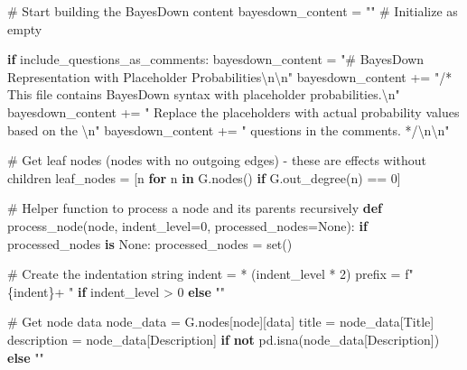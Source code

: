 \documentclass[
  11pt,
  letterpaper,
]{book}
\newenvironment{Shaded}{\begin{snugshade}}{\end{snugshade}}
\newcommand{\BuiltInTok}[1]{\textcolor[rgb]{0.00,0.23,0.31}{#1}}
\newcommand{\CharTok}[1]{\textcolor[rgb]{0.13,0.47,0.30}{#1}}
\newcommand{\CommentTok}[1]{\textcolor[rgb]{0.37,0.37,0.37}{#1}}
\newcommand{\ControlFlowTok}[1]{\textcolor[rgb]{0.00,0.23,0.31}{\textbf{#1}}}
\newcommand{\DecValTok}[1]{\textcolor[rgb]{0.68,0.00,0.00}{#1}}
\newcommand{\KeywordTok}[1]{\textcolor[rgb]{0.00,0.23,0.31}{\textbf{#1}}}
\newcommand{\NormalTok}[1]{\textcolor[rgb]{0.00,0.23,0.31}{#1}}
\newcommand{\OperatorTok}[1]{\textcolor[rgb]{0.37,0.37,0.37}{#1}}
\newcommand{\SpecialCharTok}[1]{\textcolor[rgb]{0.37,0.37,0.37}{#1}}
\newcommand{\SpecialStringTok}[1]{\textcolor[rgb]{0.13,0.47,0.30}{#1}}
\newcommand{\StringTok}[1]{\textcolor[rgb]{0.13,0.47,0.30}{#1}}
\newcommand{\VariableTok}[1]{\textcolor[rgb]{0.07,0.07,0.07}{#1}}
\begin{document}
\begin{Shaded}
\begin{Highlighting}[]
  \CommentTok{\# Start building the BayesDown content}
\NormalTok{  bayesdown\_content }\OperatorTok{=} \StringTok{""}  \CommentTok{\# Initialize as empty}

  \ControlFlowTok{if}\NormalTok{ include\_questions\_as\_comments:}
\NormalTok{    bayesdown\_content }\OperatorTok{=} \StringTok{"\# BayesDown Representation with Placeholder Probabilities}\CharTok{\textbackslash{}n\textbackslash{}n}\StringTok{"}
\NormalTok{    bayesdown\_content }\OperatorTok{+=} \StringTok{"/* This file contains BayesDown syntax with placeholder probabilities.}\CharTok{\textbackslash{}n}\StringTok{"}
\NormalTok{    bayesdown\_content }\OperatorTok{+=} \StringTok{"   Replace the placeholders with actual probability values based on the }\CharTok{\textbackslash{}n}\StringTok{"}
\NormalTok{    bayesdown\_content }\OperatorTok{+=} \StringTok{"   questions in the comments. */}\CharTok{\textbackslash{}n\textbackslash{}n}\StringTok{"}

  \CommentTok{\# Get leaf nodes (nodes with no outgoing edges) {-} these are effects without children}
\NormalTok{  leaf\_nodes }\OperatorTok{=}\NormalTok{ [n }\ControlFlowTok{for}\NormalTok{ n }\KeywordTok{in}\NormalTok{ G.nodes() }\ControlFlowTok{if}\NormalTok{ G.out\_degree(n) }\OperatorTok{==} \DecValTok{0}\NormalTok{]}

  \CommentTok{\# Helper function to process a node and its parents recursively}
  \KeywordTok{def}\NormalTok{ process\_node(node, indent\_level}\OperatorTok{=}\DecValTok{0}\NormalTok{, processed\_nodes}\OperatorTok{=}\VariableTok{None}\NormalTok{):}
      \ControlFlowTok{if}\NormalTok{ processed\_nodes }\KeywordTok{is} \VariableTok{None}\NormalTok{:}
\NormalTok{          processed\_nodes }\OperatorTok{=} \BuiltInTok{set}\NormalTok{()}

      \CommentTok{\# Create the indentation string}
\NormalTok{      indent }\OperatorTok{=} \StringTok{\textquotesingle{} \textquotesingle{}} \OperatorTok{*}\NormalTok{ (indent\_level }\OperatorTok{*} \DecValTok{2}\NormalTok{)}
\NormalTok{      prefix }\OperatorTok{=} \SpecialStringTok{f"}\SpecialCharTok{\{}\NormalTok{indent}\SpecialCharTok{\}}\SpecialStringTok{+ "} \ControlFlowTok{if}\NormalTok{ indent\_level }\OperatorTok{\textgreater{}} \DecValTok{0} \ControlFlowTok{else} \StringTok{""}

      \CommentTok{\# Get node data}
\NormalTok{      node\_data }\OperatorTok{=}\NormalTok{ G.nodes[node][}\StringTok{\textquotesingle{}data\textquotesingle{}}\NormalTok{]}
\NormalTok{      title }\OperatorTok{=}\NormalTok{ node\_data[}\StringTok{\textquotesingle{}Title\textquotesingle{}}\NormalTok{]}
\NormalTok{      description }\OperatorTok{=}\NormalTok{ node\_data[}\StringTok{\textquotesingle{}Description\textquotesingle{}}\NormalTok{] }\ControlFlowTok{if} \KeywordTok{not}\NormalTok{ pd.isna(node\_data[}\StringTok{\textquotesingle{}Description\textquotesingle{}}\NormalTok{]) }\ControlFlowTok{else} \StringTok{""}


\end{Highlighting}
\end{Shaded}
\end{document}
